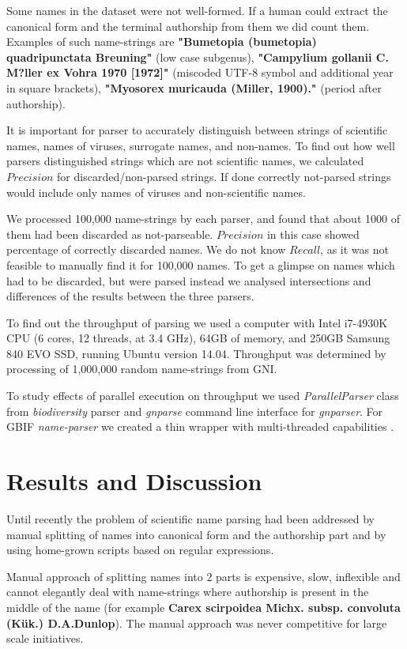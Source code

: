 \documentclass{bmcart}
\begin{document}
Some names in the dataset were not well-formed. If a human could extract the
canonical form and the terminal authorship from them we did count them.
Examples of such name-strings are \textbf{"Bumetopia (bumetopia)
quadripunctata Breuning"} (low case subgenus), \textbf{"Campylium gollanii C.
M?ller ex Vohra 1970 [1972]"} (miscoded UTF-8 symbol and additional year in
square brackets), \textbf{"Myosorex muricauda (Miller, 1900)."} (period after
authorship).

It is important for parser to accurately distinguish between strings of
scientific names, names of viruses, surrogate names, and non-names. To find
out how well parsers distinguished strings which are not scientific names, we
calculated $Precision$ for discarded/non-parsed strings. If done correctly
not-parsed strings would include only names of viruses and non-scientific
names.

We processed 100,000 name-strings by each parser, and found that about 1000 of
them had been discarded as not-parseable. $Precision$ in this case showed
percentage of correctly discarded names.  We do not know $Recall$, as it was
not feasible to manually find it for 100,000 names. To get a glimpse on names
which had to be discarded, but were parsed instead we analysed intersections
and differences of the results between the three parsers.

To find out the throughput of parsing we used a computer with Intel i7-4930K
CPU (6 cores, 12 threads, at 3.4 GHz), 64GB of memory, and 250GB Samsung 840
EVO SSD, running Ubuntu version 14.04. Throughput was determined by processing
of 1,000,000 random name-strings from GNI.

To study effects of parallel execution on throughput we used
\textit{ParallelParser} class from \textit{biodiversity} parser and
\textit{gnparse} command line interface for \textit{gnparser}. For GBIF
\textit{name-parser} we created a thin wrapper with multi-threaded
capabilities \cite{gbifparser}.
\section*{Results and Discussion}

Until recently the problem of scientific name parsing had been addressed by
manual splitting of names into canonical form and the authorship part and
by using home-grown scripts based on regular expressions.

Manual approach of splitting names into 2 parts is expensive, slow, inflexible
and cannot elegantly deal with name-strings where authorship is present in the
middle of the name (for example \textbf{Carex scirpoidea Michx. subsp. convoluta
(Kük.) D.A.Dunlop}). The manual approach was never competitive for large scale
initiatives.
\end{document}
